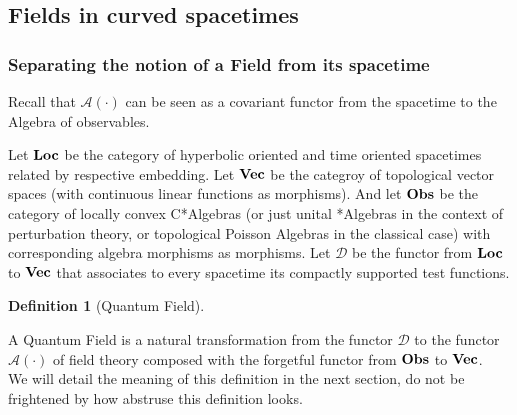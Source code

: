 \documentclass[a4paper,11pt]{article}
\numberwithin{equation}{section}
\theoremstyle{definition}
\newtheorem{definition}{Definition}
\begin{document}
    
\subsection{Fields in curved spacetimes}

\subsubsection{Separating the notion of a Field from its spacetime}
Recall that $\mathcal{A}(\cdot)$ can be seen as a covariant functor from the spacetime to the Algebra of observables.
        
Let $\bold{Loc}$ be the category of hyperbolic oriented and time oriented spacetimes related by respective embedding. Let $\bold{Vec}$ be the categroy of topological vector spaces (with continuous linear functions as morphisms). And let $\bold{Obs}$ be the category of locally convex C*Algebras (or just unital *Algebras in the context of perturbation theory, or topological Poisson Algebras in the classical case) with corresponding algebra morphisms as morphisms. 
Let $\mathcal{D}$ be the functor from $\bold{Loc}$ to $\bold{Vec}$ that associates to every spacetime its compactly supported test functions.

\begin{definition}[Quantum Field]\label{QField}$\quad$

    A Quantum Field is a natural transformation from the functor $\mathcal{D}$ to the functor $\mathcal{A}(\cdot)$ of field theory composed with the forgetful functor from $\bold{Obs}$ to $\bold{Vec}$.\\
    We will detail the meaning of this definition in the next section, do not be frightened by how abstruse this definition looks.
\end{definition}
\end{document}
